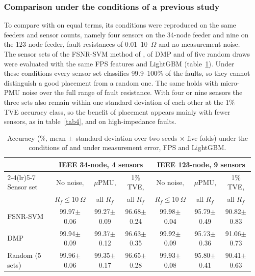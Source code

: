 \documentclass[11pt]{article}
\newenvironment{nw}{}{}
\newcommand{\hlnew}[1]{#1}
\begin{document}
\subsubsection{Comparison under the conditions of a previous study}\label{subsec5_repro}

\begin{nw}
To compare with \cite{khattak2025} on equal terms, its conditions were reproduced on the same feeders and sensor counts, namely four sensors on the 34-node feeder and nine on the 123-node feeder, fault resistances of 0.01--10~$\Omega$ and no measurement noise. The sensor sets of the FSNR-SVM method of \cite{khattak2025}, of DMP and of five random draws were evaluated with the same FPS features and LightGBM (table~\ref{tab_repro}). Under these conditions every sensor set classifies 99.9--100\% of the faults, so they cannot distinguish a good placement from a random one. The same holds with micro-PMU noise over the full range of fault resistance. With four or nine sensors the three sets also remain within one standard deviation of each other at the 1\% TVE accuracy class, so the benefit of placement appears mainly with fewer sensors, as in table~\ref{tab4}, and on high-impedance faults.
\end{nw}

\begin{table}[!htbp]
\centering
\caption{\hlnew{Accuracy (\%, mean $\pm$ standard deviation over two seeds $\times$ five folds) under the conditions of \cite{khattak2025} and under measurement error, FPS and LightGBM.}}\label{tab_repro}
\small
\begin{tabular}{lcccccc}
\toprule
 & \multicolumn{3}{c}{IEEE 34-node, 4 sensors} & \multicolumn{3}{c}{IEEE 123-node, 9 sensors}\\
\cmidrule(lr){2-4}\cmidrule(lr){5-7}
Sensor set & No noise, & $\mu$PMU, & 1\% TVE, & No noise, & $\mu$PMU, & 1\% TVE,\\
 & $R_f\le10~\Omega$ & all $R_f$ & all $R_f$ & $R_f\le10~\Omega$ & all $R_f$ & all $R_f$\\
\midrule
FSNR-SVM \cite{khattak2025} & 99.97$\pm$0.06 & 99.27$\pm$0.09 & 96.68$\pm$0.24 & 99.98$\pm$0.04 & 95.79$\pm$0.49 & 90.82$\pm$0.83\\
DMP & 99.94$\pm$0.09 & 99.37$\pm$0.12 & 96.63$\pm$0.35 & 99.92$\pm$0.09 & 95.73$\pm$0.36 & 91.06$\pm$0.73\\
Random (5 sets) & 99.96$\pm$0.06 & 99.35$\pm$0.17 & 96.65$\pm$0.28 & 99.93$\pm$0.08 & 95.80$\pm$0.41 & 90.41$\pm$0.63\\
\bottomrule
\end{tabular}
\end{table}
\end{document}
